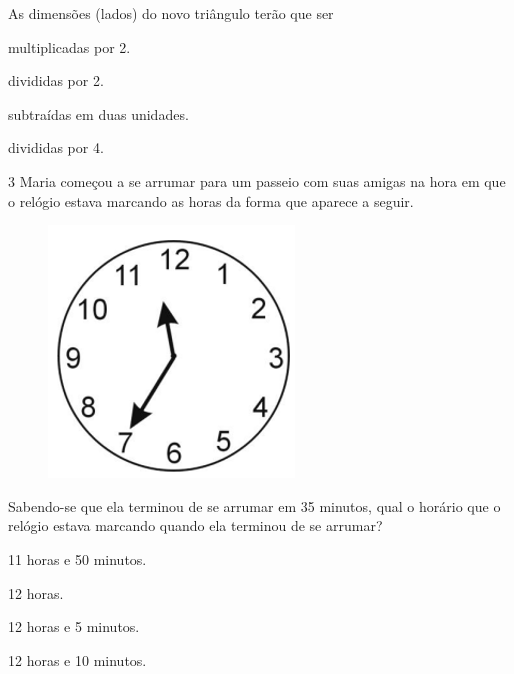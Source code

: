 As dimensões (lados) do novo triângulo terão que ser

\begin{minipage}{.5\textwidth}
\begin{escolha}
\item
  multiplicadas por 2.
\item
  divididas por 2.
\item
  subtraídas em duas unidades.
\item
  divididas por 4.
\end{escolha}
\end{minipage}

\pagebreak
\num{3} Maria começou a se arrumar para um passeio com suas amigas na hora
em que o relógio estava marcando as horas da forma que aparece a seguir.

\begin{figure}[htpb!]
\centering
\includegraphics[width=.5\textwidth]{./imgs/mat9.png}
\end{figure}

Sabendo-se que ela terminou de se arrumar em 35 minutos, qual o horário
que o relógio estava marcando quando ela terminou de se arrumar?

\begin{minipage}{.5\textwidth}
\begin{escolha}
\item
  11 horas e 50 minutos.
\item
  12 horas.
\item
  12 horas e 5 minutos.
\item
  12 horas e 10 minutos.
\end{escolha}
\end{minipage}

